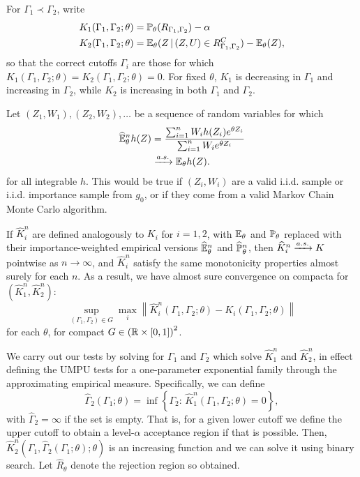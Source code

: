 \documentclass{article}
\theoremstyle{definition}
\begin{document}
\begin{appendix}
For $\Gamma_1 \prec \Gamma_2$, write
\begin{align}
  K_1(\Gamma_1,\Gamma_2;\theta) &= \P_\theta(R_{\Gamma_1,\Gamma_2}) - \alpha\\
  K_2(\Gamma_1,\Gamma_2;\theta) &= \E_\theta(Z \gv (Z,U)\in R_{\Gamma_1,\Gamma_2}^C) - \E_\theta(Z),
\end{align}
so that the correct cutoffs $\Gamma_i$ are those for which $K_1(\Gamma_1,\Gamma_2;\theta)=K_2(\Gamma_1,\Gamma_2;\theta)=0$.
For fixed $\theta$, $K_1$ is decreasing in $\Gamma_1$ and increasing in $\Gamma_2$, while $K_2$ is increasing in both $\Gamma_1$ and $\Gamma_2$.

Let $(Z_1,W_1), (Z_2,W_2), \ldots$ be a sequence of random variables for which
\begin{align}
  \widehat \E_\theta^n h(Z) &=
  \frac{\sum_{i=1}^n W_i h(Z_i)e^{\theta Z_i} }
  {\sum_{i=1}^n W_ie^{\theta Z_i}}\\
  &\toAS \E_\theta h(Z).
\end{align}
for all integrable $h$. This would be true if $(Z_i,W_i)$ are a valid i.i.d. sample or i.i.d. importance sample from $g_0$, or if they come from a valid Markov Chain Monte Carlo algorithm.

If $\widehat K_i^{n}$ are defined analogously to $K_i$ for $i=1,2$, with $\E_\theta$ and $\P_\theta$ replaced with their importance-weighted empirical versions $\widehat \E_\theta^n$ and $\widehat\P_\theta^n$, then $\widehat K_i^n \toAS K$ pointwise as $n\to\infty$, and  $\widehat K_i^n$ satisfy the same monotonicity properties almost surely for each $n$. As a result, we have almost sure convergence on compacta for $(\widehat K_1^n,\widehat K_2^n)$:
\begin{equation}
  \sup_{(\Gamma_1,\Gamma_2)\in G} \max_i \left\|\widehat K_i^n(\Gamma_1,\Gamma_2;\theta) - K_i(\Gamma_1,\Gamma_2;\theta)\right\|
\end{equation}
for each $\theta$, for compact $G \in \left(\R\times [0,1]\right)^2$.

We carry out our tests by solving for $\Gamma_1$ and $\Gamma_2$ which solve $\widehat K_1^n$ and $\widehat K_2^n$, in effect defining the UMPU tests for a one-parameter exponential family through the approximating empirical measure. Specifically, we can define \begin{equation}
  \widehat \Gamma_2(\Gamma_1;\theta) = \inf \left\{\Gamma_2:\, \widehat K_1^n(\Gamma_1,\Gamma_2;\theta) = 0\right\},
\end{equation}
with $\widehat \Gamma_2=\infty$ if the set is empty. That is, for a given lower cutoff we define the upper cutoff to obtain a level-$\alpha$ acceptance region if that is possible.
Then, $\widehat K_2^n\left(\Gamma_1,\widehat\Gamma_2(\Gamma_1;\theta);\theta\right)$ is an increasing function and we can solve it using binary search. Let $\widehat R_\theta$ denote the rejection region so obtained.


\end{appendix}
\end{document}
